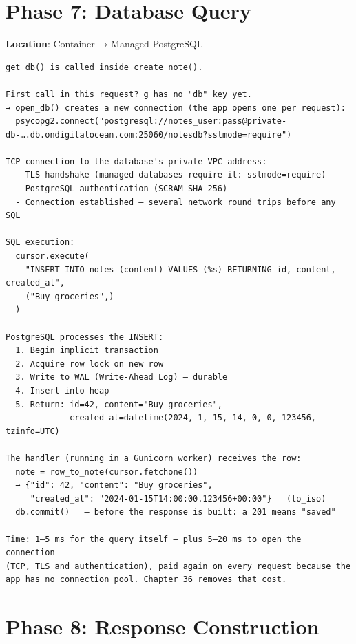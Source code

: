 \setcounter{section}{7}
\section{Phase 7: Database Query}\label{29-client-server-journey:298-phase-7-database-query}

\textbf{Location}: Container → Managed PostgreSQL

\begin{outputbox}
\begin{Verbatim}[fontsize=\codesize, breaklines, breakanywhere, breaksymbolleft={\tiny\textcolor{muted}{$\hookrightarrow$}}]
get_db() is called inside create_note().

First call in this request? g has no "db" key yet.
→ open_db() creates a new connection (the app opens one per request):
  psycopg2.connect("postgresql://notes_user:pass@private-db-….db.ondigitalocean.com:25060/notesdb?sslmode=require")

TCP connection to the database's private VPC address:
  - TLS handshake (managed databases require it: sslmode=require)
  - PostgreSQL authentication (SCRAM-SHA-256)
  - Connection established — several network round trips before any SQL

SQL execution:
  cursor.execute(
    "INSERT INTO notes (content) VALUES (%s) RETURNING id, content, created_at",
    ("Buy groceries",)
  )

PostgreSQL processes the INSERT:
  1. Begin implicit transaction
  2. Acquire row lock on new row
  3. Write to WAL (Write-Ahead Log) — durable
  4. Insert into heap
  5. Return: id=42, content="Buy groceries",
             created_at=datetime(2024, 1, 15, 14, 0, 0, 123456, tzinfo=UTC)

The handler (running in a Gunicorn worker) receives the row:
  note = row_to_note(cursor.fetchone())
  → {"id": 42, "content": "Buy groceries",
     "created_at": "2024-01-15T14:00:00.123456+00:00"}   (to_iso)
  db.commit()   — before the response is built: a 201 means "saved"

Time: 1–5 ms for the query itself — plus 5–20 ms to open the connection
(TCP, TLS and authentication), paid again on every request because the
app has no connection pool. Chapter 36 removes that cost.
\end{Verbatim}
\end{outputbox}

\setcounter{section}{8}
\section{Phase 8: Response Construction}\label{29-client-server-journey:299-phase-8-response-construction}

